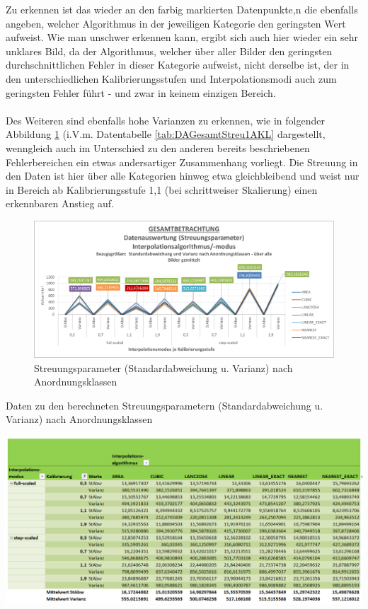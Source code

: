 \documentclass[
fontsize=10pt, 
listof = totoc,
parskip = half	
]{report}
\begin{document}
\noindent Zu erkennen ist das wieder an den farbig markierten Datenpunkte,n die ebenfalls angeben, welcher Algorithmus in der jeweiligen Kategorie den geringsten Wert aufweist. Wie man unschwer erkennen kann, ergibt sich auch hier wieder ein sehr unklares Bild, da der Algorithmus, welcher über aller Bilder den geringsten durchschnittlichen Fehler in dieser Kategorie aufweist, nicht derselbe ist, der in den unterschiedlichen Kalibrierungsstufen und Interpolationsmodi auch zum geringsten Fehler führt - und zwar in keinem einzigen Bereich.
\\\\
Des Weiteren sind ebenfalls hohe Varianzen zu erkennen, wie in folgender Abbildung \ref{fig:DAGesamtStreu1AKL} (i.V.m. Datentabelle \ref{tab:DAGesamtStreu1AKL} dargestellt, wenngleich auch im Unterschied zu den anderen bereits beschriebenen Fehlerbereichen ein etwas andersartiger Zusammenhang vorliegt. Die Streuung in den Daten ist hier über alle Kategorien hinweg etwa gleichbleibend und weist nur in Bereich ab Kalibrierungsstufe 1,1 (bei schrittweiser Skalierung) einen erkennbaren Anstieg auf.

\begin{figure}[H]
	\centering
	\includegraphics[width=\textwidth, height=\textheight, keepaspectratio]{pics/DA_Gesamt_Streu1_AKL}
	\caption{Streuungsparameter (Standardabweichung u. Varianz) nach Anordnungsklassen}
	\label{fig:DAGesamtStreu1AKL}
\end{figure}

\begin{table}[H]
	\caption{Daten zu den berechneten Streuungsparametern (Standardabweichung u. Varianz) nach Anordnungsklassen}
	\centering
	\includegraphics[width=\textwidth, height=\textheight, keepaspectratio]{pics/Tab_DA_Gesamt_Streu1_AKL}
	\label{tab:DAGesamtStreu1AKL}
\end{table}
\end{document}
